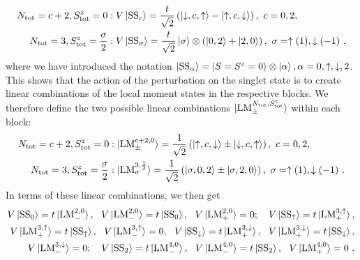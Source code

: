 \documentclass{iopart}
\begin{document}
\begin{eqnarray}
	N_\text{tot} = c+2, S_\text{tot}^z = 0 &: V\ket{\text{SS}_c} = \frac{t}{\sqrt 2}\left( \ket{\downarrow,c,\uparrow} - \ket{\uparrow,c,\downarrow} \right),~ c=0,2,\nonumber\\
	N_\text{tot} = 3, S_\text{tot}^z = \frac{\sigma}{2} &: V\ket{\text{SS}_\sigma} = \frac{t}{\sqrt 2}\ket{\sigma}\otimes\left(\ket{0,2} + \ket{2,0}\right),~\sigma=\uparrow(1),\downarrow(-1)~,
\end{eqnarray}
where we have introduced the notation \(\ket{\text{SS}_{\alpha}} = \ket{S=S^z=0}\otimes\ket{\alpha},\alpha=0,\uparrow,\downarrow,2\). This shows that the action of the perturbation on the singlet state is to create linear combinations of the local moment states in the respective blocks. We therefore define the two possible linear combinations \(\ket{\text{LM}_\pm^{N_\text{tot},S_\text{tot}^z}}\) within each block:
\begin{eqnarray}
	N_\text{tot} = c+2, S_\text{tot}^z = 0 &: \ket{\text{LM}_\pm^{c+2,0}} = \frac{1}{\sqrt 2}\left(\ket{\uparrow, c, \downarrow} \pm \ket{\downarrow, c, \uparrow}\right),~c=0,2,\nonumber\\
	N_\text{tot} = 3, S_\text{tot}^z = \frac{\sigma}{2} &: \ket{\text{LM}_{\sigma}^{3,\frac{1}{2}}} = \frac{1}{\sqrt 2}\left(\ket{\sigma, 0, 2} \pm \ket{\sigma, 2, 0}\right),~\sigma=\uparrow(1), \downarrow(-1)~.
\end{eqnarray}
In terms of these linear combinations, we then get
\begin{eqnarray}
	V\ket{\text{SS}_0} = t\ket{\text{LM}_-^{2,0}}, ~ ~ V\ket{\text{LM}_-^{2,0}} = t\ket{\text{SS}_0}, ~ ~V\ket{\text{LM}_+^{2,0}} = 0; \quad V\ket{\text{SS}_\uparrow} = t\ket{\text{LM}_+^{3, \uparrow}},\nonumber \\
	V\ket{\text{LM}_+^{3, \uparrow}} = t\ket{\text{SS}_\uparrow}, ~ ~V\ket{\text{LM}_-^{3, \uparrow}} = 0, ~ ~ V\ket{\text{SS}_\downarrow} = t\ket{\text{LM}_+^{3, \downarrow}}, ~ ~ V\ket{\text{LM}_+^{3, \downarrow}} = t\ket{\text{SS}_\downarrow},\nonumber \\
	V\ket{\text{LM}_-^{3, \downarrow}} = 0; \quad V\ket{\text{SS}_2} = t\ket{\text{LM}_-^{4,0}}, ~ ~ V\ket{\text{LM}_-^{4,0}} = t\ket{\text{SS}_2}, ~ ~V\ket{\text{LM}_+^{4,0}} = 0~.
\end{eqnarray}
\end{document}
